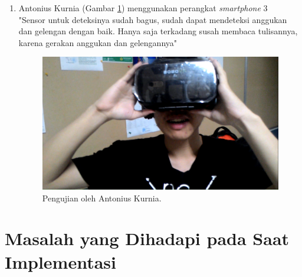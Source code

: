 \begin{enumerate}
    \item Antonius Kurnia (Gambar \ref{fig:pengujian_antonius_kurnia}) menggunakan perangkat \textit{smartphone} 3\\
    
    "Sensor untuk deteksinya sudah bagus, sudah dapat mendeteksi anggukan dan gelengan dengan baik. Hanya saja terkadang susah membaca tulisannya, karena gerakan anggukan dan gelengannya"
    
    \begin{figure}[htbp]
    \centering
    \includegraphics[scale=0.3]{Gambar/PengujianEksperimental/AntoniusKurnia.png}
    \caption{Pengujian oleh Antonius Kurnia.} 
    \label{fig:pengujian_antonius_kurnia}
    \end{figure}
    
\end{enumerate}

\section{Masalah yang Dihadapi pada Saat Implementasi}

